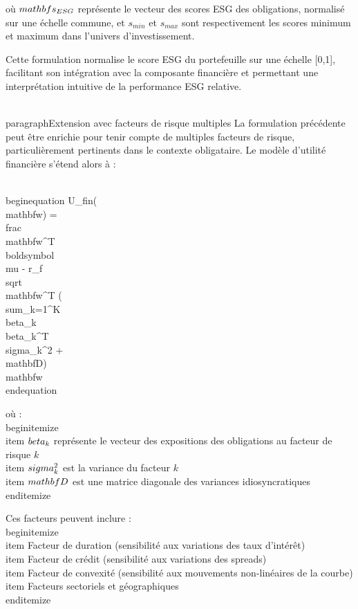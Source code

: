 où $\\mathbf{s}_{ESG}$ représente le vecteur des scores ESG des obligations, normalisé sur une échelle commune, et $s_{min}$ et $s_{max}$ sont respectivement les scores minimum et maximum dans l'univers d'investissement.

Cette formulation normalise le score ESG du portefeuille sur une échelle [0,1], facilitant son intégration avec la composante financière et permettant une interprétation intuitive de la performance ESG relative.

\\paragraph{Extension avec facteurs de risque multiples}
La formulation précédente peut être enrichie pour tenir compte de multiples facteurs de risque, particulièrement pertinents dans le contexte obligataire. Le modèle d'utilité financière s'étend alors à :

\\begin{equation}
U_{fin}(\\mathbf{w}) = \\frac{\\mathbf{w}^T \\boldsymbol{\\mu} - r_f}{\\sqrt{\\mathbf{w}^T (\\sum_{k=1}^{K} \\beta_k \\beta_k^T \\sigma_k^2 + \\mathbf{D}) \\mathbf{w}}}
\\end{equation}

où :
\\begin{itemize}
    \\item $\\beta_k$ représente le vecteur des expositions des obligations au facteur de risque $k$
    \\item $\\sigma_k^2$ est la variance du facteur $k$
    \\item $\\mathbf{D}$ est une matrice diagonale des variances idiosyncratiques
\\end{itemize}

Ces facteurs peuvent inclure :
\\begin{itemize}
    \\item Facteur de duration (sensibilité aux variations des taux d'intérêt)
    \\item Facteur de crédit (sensibilité aux variations des spreads)
    \\item Facteur de convexité (sensibilité aux mouvements non-linéaires de la courbe)
    \\item Facteurs sectoriels et géographiques
\\end{itemize}

